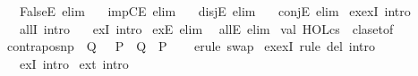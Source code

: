 \begin{isabellebody}
\ \ \ FalseE\ {\isacharbrackleft}{\kern0pt}elim{\isacharbang}{\kern0pt}{\isacharbrackright}{\kern0pt}\isanewline
\ \ \ impCE\ {\isacharbrackleft}{\kern0pt}elim{\isacharbang}{\kern0pt}{\isacharbrackright}{\kern0pt}\isanewline
\ \ \ disjE\ {\isacharbrackleft}{\kern0pt}elim{\isacharbang}{\kern0pt}{\isacharbrackright}{\kern0pt}\isanewline
\ \ \ conjE\ {\isacharbrackleft}{\kern0pt}elim{\isacharbang}{\kern0pt}{\isacharbrackright}{\kern0pt}\isanewline
\isanewline
{}\isamarkupfalse%
\ ex{\isacharunderscore}{\kern0pt}ex{}I\ {\isacharbrackleft}{\kern0pt}intro{\isacharbang}{\kern0pt}{\isacharbrackright}{\kern0pt}\isanewline
\ \ \ allI\ {\isacharbrackleft}{\kern0pt}intro{\isacharbang}{\kern0pt}{\isacharbrackright}{\kern0pt}\isanewline
\ \ \ exI\ {\isacharbrackleft}{\kern0pt}intro{\isacharbrackright}{\kern0pt}\isanewline
\isanewline
{}\isamarkupfalse%
\ exE\ {\isacharbrackleft}{\kern0pt}elim{\isacharbang}{\kern0pt}{\isacharbrackright}{\kern0pt}\isanewline
\ \ allE\ {\isacharbrackleft}{\kern0pt}elim{\isacharbrackright}{\kern0pt}\isanewline
%
\isadelimML
\isanewline
%
\endisadelimML
%
\isatagML
{}\isamarkupfalse%
\ {\isacartoucheopen}val\ HOL{\isacharunderscore}{\kern0pt}cs\ {\isacharequal}{\kern0pt}\ claset{\isacharunderscore}{\kern0pt}of\ \isactrlcontext {\isacartoucheclose}%
\endisatagML
{\isafoldML}%
%
\isadelimML
\isanewline
%
\endisadelimML
\isanewline
{}\isamarkupfalse%
\ contrapos{\isacharunderscore}{\kern0pt}np{\isacharcolon}{\kern0pt}\ {\isachardoublequoteopen}{\isasymnot}\ Q\ {\isasymLongrightarrow}\ {\isacharparenleft}{\kern0pt}{\isasymnot}\ P\ {\isasymLongrightarrow}\ Q{\isacharparenright}{\kern0pt}\ {\isasymLongrightarrow}\ P{\isachardoublequoteclose}\isanewline
%
\isadelimproof
\ \ %
\endisadelimproof
%
\isatagproof
{}\isamarkupfalse%
\ {\isacharparenleft}{\kern0pt}erule\ swap{\isacharparenright}{\kern0pt}%
\endisatagproof
{\isafoldproof}%
%
\isadelimproof
\isanewline
%
\endisadelimproof
\isanewline
{}\isamarkupfalse%
\ ex{\isacharunderscore}{\kern0pt}ex{}I\ {\isacharbrackleft}{\kern0pt}rule\ del{\isacharcomma}{\kern0pt}\ intro{\isacharbang}{\kern0pt}\ {}{\isacharbrackright}{\kern0pt}\isanewline
\ \ \ ex{}I\ {\isacharbrackleft}{\kern0pt}intro{\isacharbrackright}{\kern0pt}\isanewline
\isanewline
{}\isamarkupfalse%
\ ext\ {\isacharbrackleft}{\kern0pt}intro{\isacharbrackright}{\kern0pt}\isanewline

\end{isabellebody}

